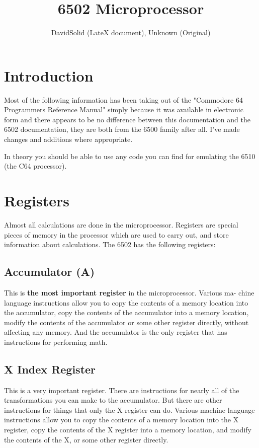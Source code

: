 \documentclass{article}
\title{6502 Microprocessor}
\author{DavidSolid (LateX document), Unknown (Original)}
\begin{document}
\maketitle
\tableofcontents
\newpage

\section{Introduction}
 Most of the following information has been taking out of the "Commodore 64
Programmers Reference Manual" simply because it was available in electronic
form and there appears to be no difference between this documentation and
the 6502 documentation, they are both from the 6500 family after all. I've
made changes and additions where appropriate.

 In theory you should be able to use any code you can find for emulating
the 6510 (the C64 processor).

\section{Registers}

Almost all calculations are done in the microprocessor. Registers are
special pieces of memory in the processor which are used to carry out, and
store information about calculations. The 6502 has the following registers:


  \subsection{Accumulator (A)}

    This is \textbf{the most important register} in the microprocessor. Various ma-
  chine language instructions allow you to copy the contents of a memory
  location into the accumulator, copy the contents of the accumulator into
  a memory location, modify the contents of the accumulator or some other
  register directly, without affecting any memory. And the accumulator is
  the only register that has instructions for performing math.


  \subsection{X Index Register}

    This is a very important register. There are instructions for nearly
  all of the transformations you can make to the accumulator. But there are
  other instructions for things that only the X register can do. Various
  machine language instructions allow you to copy the contents of a memory
  location into the X register, copy the contents of the X register into a
  memory location, and modify the contents of the X, or some other register
  directly.
\end{document}
